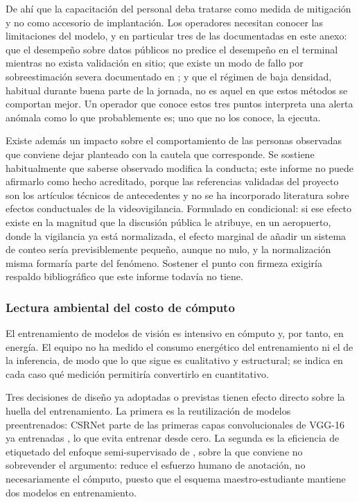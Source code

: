 De ahí que la capacitación del personal deba tratarse como medida de
mitigación y no como accesorio de implantación. Los operadores necesitan
conocer las limitaciones del modelo, y en particular tres de las
documentadas en este anexo: que el desempeño sobre datos públicos no
predice el desempeño en el terminal mientras no exista validación en
sitio; que existe un modo de fallo por sobreestimación severa
documentado en \cite{Lin_2025_CVPR}; y que el régimen de baja densidad,
habitual durante buena parte de la jornada, no es aquel en que estos
métodos se comportan mejor. Un operador que conoce estos tres puntos
interpreta una alerta anómala como lo que probablemente es; uno que no
los conoce, la ejecuta.

Existe además un impacto sobre el comportamiento de las personas
observadas que conviene dejar planteado con la cautela que corresponde.
Se sostiene habitualmente que saberse observado modifica la conducta;
este informe no puede afirmarlo como hecho acreditado, porque las
referencias validadas del proyecto son los artículos técnicos de
antecedentes y no se ha incorporado literatura sobre efectos
conductuales de la videovigilancia. Formulado en condicional: si ese
efecto existe en la magnitud que la discusión pública le atribuye, en un
aeropuerto, donde la vigilancia ya está normalizada, el efecto marginal
de añadir un sistema de conteo sería previsiblemente pequeño, aunque no
nulo, y la normalización misma formaría parte del fenómeno. Sostener el
punto con firmeza exigiría respaldo bibliográfico que este informe
todavía no tiene.

\subsubsection{Lectura ambiental del costo de cómputo}

El entrenamiento de modelos de visión es intensivo en cómputo y, por
tanto, en energía. El equipo no ha medido el consumo energético del
entrenamiento ni el de la inferencia, de modo que lo que sigue es
cualitativo y estructural; se indica en cada caso qué medición
permitiría convertirlo en cuantitativo.

Tres decisiones de diseño ya adoptadas o previstas tienen efecto directo
sobre la huella del entrenamiento. La primera es la reutilización de
modelos preentrenados: CSRNet parte de las primeras capas
convolucionales de VGG-16 ya entrenadas \cite{Li_2018_CVPR}, lo que
evita entrenar desde cero. La segunda es la eficiencia de etiquetado del
enfoque semi-supervisado de \cite{Lin_2025_CVPR}, sobre la que conviene
no sobrevender el argumento: reduce el esfuerzo humano de anotación, no
necesariamente el cómputo, puesto que el esquema maestro-estudiante
mantiene dos modelos en entrenamiento.

